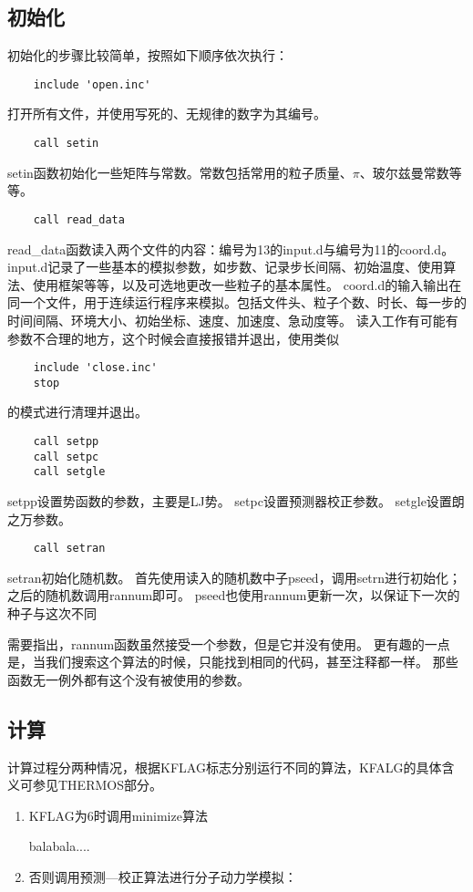 \documentclass[UTF-8]{ctexart}
\begin{document}
\subsection{初始化}
初始化的步骤比较简单，按照如下顺序依次执行：
\begin{verbatim}
    include 'open.inc'
\end{verbatim}
打开所有文件，并使用写死的、无规律的数字为其编号。
\begin{verbatim}
    call setin
\end{verbatim}
setin函数初始化一些矩阵与常数。常数包括常用的粒子质量、$\pi$、玻尔兹曼常数等等。
\begin{verbatim}
    call read_data
\end{verbatim}
read\_data函数读入两个文件的内容：编号为13的input.d与编号为11的coord.d。
input.d记录了一些基本的模拟参数，如步数、记录步长间隔、初始温度、使用算法、使用框架等等，以及可选地更改一些粒子的基本属性。
coord.d的输入输出在同一个文件，用于连续运行程序来模拟。包括文件头、粒子个数、时长、每一步的时间间隔、环境大小、初始坐标、速度、加速度、急动度等。
读入工作有可能有参数不合理的地方，这个时候会直接报错并退出，使用类似
\begin{verbatim}
    include 'close.inc'
    stop
\end{verbatim}
的模式进行清理并退出。
\begin{verbatim}
    call setpp
    call setpc
    call setgle
\end{verbatim}
setpp设置势函数的参数，主要是LJ势。
setpc设置预测器校正参数。
setgle设置朗之万参数。
\begin{verbatim}
    call setran
\end{verbatim}
setran初始化随机数。
首先使用读入的随机数中子pseed，调用setrn进行初始化；之后的随机数调用rannum即可。
pseed也使用rannum更新一次，以保证下一次的种子与这次不同

需要指出，rannum函数虽然接受一个参数，但是它并没有使用。
更有趣的一点是，当我们搜索这个算法的时候，只能找到相同的代码，甚至注释都一样。
那些函数无一例外都有这个没有被使用的参数。

\subsection{计算}
计算过程分两种情况，根据KFLAG标志分别运行不同的算法，KFALG的具体含义可参见THERMOS部分。

\begin{enumerate}
    \item KFLAG为6时调用minimize算法

          balabala....
    \item 否则调用预测—校正算法进行分子动力学模拟：
\end{enumerate}
\end{document}

